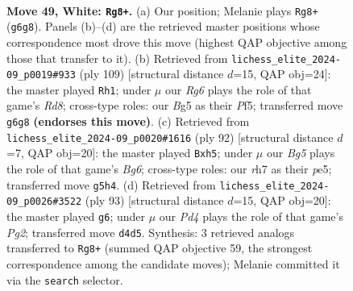 \documentclass[11pt]{article}
\begin{document}
\clearpage

\begin{figure}[p]\centering
\begin{subfigure}{0.46\textwidth}\centering
\resizebox{\linewidth}{!}{%
\newchessgame
\chessboard[
  setfen={4k3/7r/rp4R1/6B1/1p1P4/3K4/8/8 w - - 1 49},
  showmover=false,
  pgfstyle=straightmove, color=movearrow, markmove={g6-g8}
]}
\caption{}
\end{subfigure}\hfill
\begin{subfigure}{0.46\textwidth}\centering
\resizebox{\linewidth}{!}{%
\newchessgame
\chessboard[
  setfen={3R4/8/3Pk2P/5p2/8/6K1/8/3r4 b - - 0 55},
  showmover=false,
  pgfstyle=straightmove, color=movearrow, markmove={d1-h1}
]}
\caption{}
\end{subfigure}
\\[4pt]
\begin{subfigure}{0.46\textwidth}\centering
\resizebox{\linewidth}{!}{%
\newchessgame
\chessboard[
  setfen={8/4k3/R5B1/4p2p/7P/p7/5KP1/r7 w - - 3 47},
  showmover=false,
  pgfstyle=straightmove, color=movearrow, markmove={g6-h5}
]}
\caption{}
\end{subfigure}\hfill
\begin{subfigure}{0.46\textwidth}\centering
\resizebox{\linewidth}{!}{%
\newchessgame
\chessboard[
  setfen={8/4bkp1/8/R7/8/1KP1r3/8/8 b - - 0 47},
  showmover=false,
  pgfstyle=straightmove, color=movearrow, markmove={g7-g6}
]}
\caption{}
\end{subfigure}
\caption{\textbf{Move 49, White: \texttt{Rg8+}.} (a) Our position; Melanie plays \texttt{Rg8+} (\texttt{g6g8}). Panels (b)--(d) are the retrieved master positions whose correspondence most drove this move (highest QAP objective among those that transfer to it). (b) Retrieved from \texttt{lichess\_elite\_2024-09\_p0019\#933} (ply 109) [structural distance $d$=15, QAP obj=24]: the master played \texttt{Rh1}; under $\mu$ our \emph{Rg6} plays the role of that game's \emph{Rd8}; cross-type roles: our \emph{B}g5 as their \emph{P}f5; transferred move \texttt{g6g8} \textbf{(endorses this move)}. (c) Retrieved from \texttt{lichess\_elite\_2024-09\_p0020\#1616} (ply 92) [structural distance $d$=7, QAP obj=20]: the master played \texttt{Bxh5}; under $\mu$ our \emph{Bg5} plays the role of that game's \emph{Bg6}; cross-type roles: our \emph{r}h7 as their \emph{p}e5; transferred move \texttt{g5h4}. (d) Retrieved from \texttt{lichess\_elite\_2024-09\_p0026\#3522} (ply 93) [structural distance $d$=15, QAP obj=20]: the master played \texttt{g6}; under $\mu$ our \emph{Pd4} plays the role of that game's \emph{Pg2}; transferred move \texttt{d4d5}. Synthesis: 3 retrieved analogs transferred to \texttt{Rg8+} (summed QAP objective 59, the strongest correspondence among the candidate moves); Melanie committed it via the \texttt{search} selector.}
\label{fig:thought-m96}
\end{figure}
\end{document}
